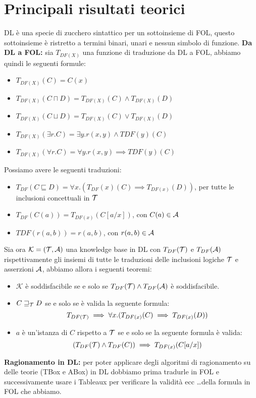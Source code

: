 \documentclass[../main.tex]{subfiles}
\begin{document}
   \section{Principali risultati teorici}
   DL è una specie di zucchero sintattico per un sottoinsieme di FOL, questo sottoinsieme è ristretto a termini binari, unari e nessun simbolo di funzione.
   \spazio
   \textbf{Da DL a FOL:} sia $T_{DF(X)}$ una funzione di traduzione da DL a FOL, abbiamo quindi le seguenti formule:
   \begin{itemize}
      \item $T_{DF(X)}(C) = C(x)$
      \item $T_{DF(X)}(C \sqcap D) = T_{DF(X)}(C) \land T_{DF(X)}(D)$
      \item $T_{DF(X)}(C \sqcup D) = T_{DF(X)}(C) \lor T_{DF(X)}(D)$
      \item $T_{DF(X)}(\exists r.C) = \exists y.r(x, y) \land TDF(y)(C)$
      \item $T_{DF(X)}(\forall r.C) = \forall y.r(x, y) \implies TDF(y)(C)$
   \end{itemize}
   Possiamo avere le seguenti traduzioni:
   \begin{itemize}
      \item $T_{DF} (C \sqsubseteq D) = \forall x.(T_{DF}(x)(C) \implies T_{DF(x)}(D))$, per tutte le inclusioni concettuali in $\mathcal{T}$
      \item $T_{DF} (C(a)) = T_{DF(x)}(C[a/x])$, con $C(a) \in \mathcal{A}$
      \item $TDF (r(a, b)) = r(a, b)$, con $r(a,b) \in \mathcal{A}$
   \end{itemize}
   Sia ora $\mathcal{K}= (\mathcal{T},\mathcal{A})$ una knowledge base in DL con $T_{DF}(\mathcal{T})$ e $T_{DF}(\mathcal{A})$ rispettivamente gli insiemi di tutte le traduzioni delle inclusioni logiche $\mathcal{T}$ e asserzioni $\mathcal{A}$, abbiamo allora i seguenti teoremi:
   \begin{itemize}
      \item $\mathcal{K}$ è soddisfacibile se e solo se $T_{DF}(\mathcal{T}) \land T_{DF}(\mathcal{A})$ è soddisfacibile.
      \item $C \sqsupseteq_{\mathcal{T}} D$ se e solo se è valida la seguente formula:
         \begin{equation*}
            T_{DF(\mathcal{T})} \implies \forall x.(T_{DF(x)}(C) \implies T_{DF(x)}(D))
         \end{equation*}
      \item $a$ è un'istanza di $C$ rispetto a $\mathcal{T}$ se e solo se la seguente formula è valida:
         \begin{equation*}
            (T_{DF}(\mathcal{T}) \land T_{DF}(C)) \implies T_{DF(x)}(C[a/x])
         \end{equation*}
   \end{itemize}
   \vspace{2em}
   \textbf{Ragionamento in DL:} per poter applicare degli algoritmi di ragionamento su delle teorie (TBox e ABox) in DL dobbiamo prima tradurle in FOL e successivamente usare i Tableaux per verificare la validità ecc \dots della formula in FOL che abbiamo.
\end{document}
